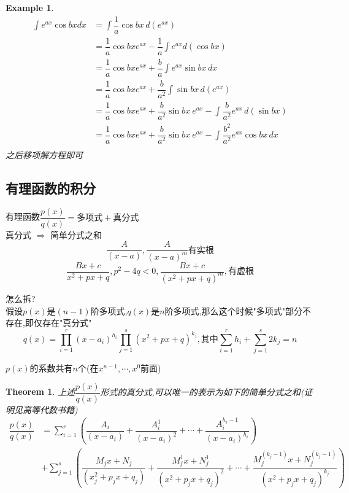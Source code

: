 \documentclass[11pt,hyperref,a4paper,UTF8]{ctexart}
\newtheorem{theorem}{Theorem}[subsection]
\newtheorem{example}{Example}[subsection]
\begin{document}
\begin{CJK}{UTF8}{gkai}
\begin{example}
  \[
  \begin{aligned}  
  \int e^{ax} \cos bx dx &= \int \dfrac{1}{a} \cos bx\, d(e^{ax}) \\
  &= \dfrac{1}{a} \cos bx e^{ax} - \dfrac{1}{a}\int e^{ax} d(\cos bx)  \\
  &= \dfrac{1}{a} \cos bx e^{ax} + \dfrac{b}{a}\int e^{ax} \sin bx \,dx\\
  &= \dfrac{1}{a} \cos bx e^{ax} + \dfrac{b}{a^2}\int  \sin bx \,d(e^{ax})\\
  &= \dfrac{1}{a} \cos bx e^{ax} + \dfrac{b}{a^2}\sin bx~ e^{ax} - \int \dfrac{b}{a^2} e^{ax} \,d(\sin bx)\\
  &= \dfrac{1}{a} \cos bx e^{ax} + \dfrac{b}{a^2}\sin bx~ e^{ax} - \int \dfrac{b^2}{a^2} e^{ax}\cos bx \,dx\\
  \end{aligned}
  \]
  之后移项解方程即可\\
\end{example}

\subsection{有理函数的积分}
有理函数$\dfrac{p(x)}{q(x)} = \text{多项式} + \text{真分式}$\\

真分式 $\Rightarrow$ 简单分式之和\\
\[\dfrac{A}{(x-a)},\dfrac{A}{(x-a)^m} \text{有实根}\]
\[\dfrac{Bx + c}{x^2 + px + q},p^2 - 4q < 0,\dfrac{Bx + c}{(x^2 + px + q)^m},\text{有虚根}\]

怎么拆?\\
假设$p(x)$是$(n-1)$阶多项式,$q(x)$是$n$阶多项式,那么这个时候"多项式"部分不存在,即仅存在"真分式"\\

\[q(x) = \prod_{i = 1}^r (x- a_i)^{h_i}\prod_{j = 1}^s (x^2 + px + q)^{k_j},\text{其中} \sum_{i = 1}^r h_i+ \sum_{j = 1}^s 2k_j = n\]

$p(x)$的系数共有$n$个(在$x^{n-1},\cdots, x^0$前面)\\

\begin{theorem}
上述$\dfrac{p(x)}{q(x)}$形式的真分式,可以唯一的表示为如下的简单分式之和(证明见高等代数书籍)
\[
\begin{aligned}  
\dfrac{p(x)}{q(x)} &= \sum_{i = 1}^r \left(\dfrac{A_i}{(x-a_i)} + \dfrac{A_i^{1}}{(x-a_i)^{2}} + \cdots + \dfrac{A_i^{h_i-1}}{(x-a_i)^{h_i}}\right) \\
&+ \sum_{j = 1}^s\left(\dfrac{M_j x + N_j }{(x_j^2 + p_j x + q_j)} + \dfrac{M_j^1 x + N_j^1 }{(x^2 + p_j x + q_j)^2} + \cdots +\dfrac{M_j^{(k_j -1)} x + N_j^{(k_j -1)} }{(x^2 + p_j  x + q_j)^{k_j}}\right)
\end{aligned}
\]
\end{theorem}


\end{CJK}
\end{document}
